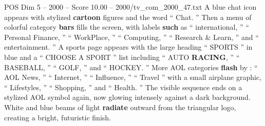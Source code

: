 \begin{textsample}{POS Dim 5 – 2000 – Score 10.00 – 2000/tv\_com\_2000\_47.txt}
A blue chat icon appears with stylized \textbf{cartoon} figures and the word “ Chat. ” Then a menu of colorful category \textbf{bars} fills the screen, with labels \textbf{such} as “ international, ” “ Personal Finance, ” “ WorkPlace, ” “ Computing, ” “ Research \& Learn, ” and “ entertainment. ” A sports page appears with the large heading “ SPORTS ” in blue and a “ CHOOSE A SPORT ” list including “ AUTO \textbf{RACING}, ” “ BASEBALL, ” “ GOLF, ” and “ HOCKEY. ” More AOL categories \textbf{flash} by : “ AOL News, ” “ Internet, ” “ Influence, ” “ Travel ” with a small airplane graphic, “ Lifestyles, ” “ Shopping, ” and “ Health. ” The visible sequence ends on a stylized AOL symbol again, now glowing intensely against a dark background.
White and blue beams of light \textbf{radiate} outward from the triangular logo, creating a bright, futuristic finish.

\end{textsample}
